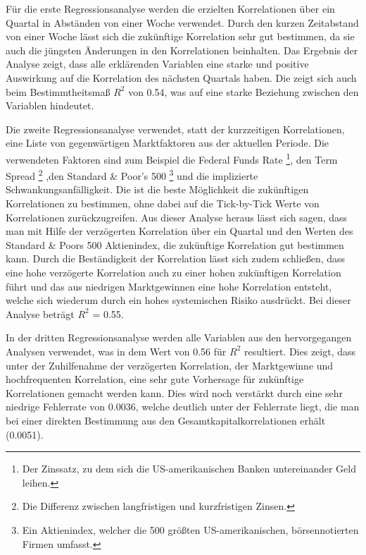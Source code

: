\documentclass[a4paper,12pt]{scrartcl}
\begin{document}
Für die erste Regressionsanalyse werden die erzielten Korrelationen über ein Quartal in Abständen von einer Woche verwendet. Durch den kurzen Zeitabstand von einer Woche lässt sich die zukünftige Korrelation sehr gut bestimmen, da sie auch die jüngsten Änderungen in den Korrelationen beinhalten. Das Ergebnis der Analyse zeigt, dass alle erklärenden Variablen eine starke und positive Auswirkung auf die Korrelation des nächsten Quartals haben. Die zeigt sich auch beim Bestimmtheitsmaß $R^2$ von 0.54, was auf eine starke Beziehung zwischen den Variablen hindeutet.


Die zweite Regressionsanalyse verwendet, statt der kurzzeitigen Korrelationen, eine Liste von gegenwärtigen Marktfaktoren aus der aktuellen Periode. Die verwendeten Faktoren sind zum Beispiel die Federal Funds Rate \footnote{Der Zinssatz, zu dem sich die US-amerikanischen Banken untereinander Geld leihen.}, den Term Spread \footnote{Die Differenz zwischen langfristigen und kurzfristigen Zinsen.} ,den Standard & Poor's 500 \footnote{Ein Aktienindex, welcher die 500 größten US-amerikanischen, börsennotierten Firmen umfasst.} und die implizierte Schwankungsanfälligkeit.
Die ist die beste Möglichkeit die zukünftigen Korrelationen zu bestimmen, ohne dabei auf die Tick-by-Tick Werte von Korrelationen zurückzugreifen.
Aus dieser Analyse heraus lässt sich sagen, dass man mit Hilfe der verzögerten Korrelation über ein Quartal und den Werten des Standard & Poors 500 Aktienindex, die zukünftige Korrelation gut bestimmen kann. 
Durch die Beständigkeit der Korrelation lässt sich zudem schließen, dass eine hohe verzögerte Korrelation auch zu einer hohen zukünftigen Korrelation führt und das aus niedrigen Marktgewinnen eine hohe Korrelation entsteht, welche sich  wiederum durch ein hohes systemischen Risiko ausdrückt.
Bei dieser Analyse beträgt $R^2$ = 0.55.

In der dritten Regressionsanalyse werden alle Variablen aus den hervorgegangen Analysen verwendet, was in dem Wert von 0.56 für $R^2$ resultiert. Dies zeigt, dass unter der Zuhilfenahme der verzögerten Korrelation, der Marktgewinne und hochfrequenten Korrelation, eine sehr gute Vorhersage für zukünftige Korrelationen gemacht werden kann. Dies wird noch verstärkt durch eine sehr niedrige Fehlerrate von 0.0036, welche deutlich unter der Fehlerrate liegt, die man bei einer direkten Bestimmung aus den Gesamtkapitalkorrelationen erhält (0.0051). 
\end{document}
